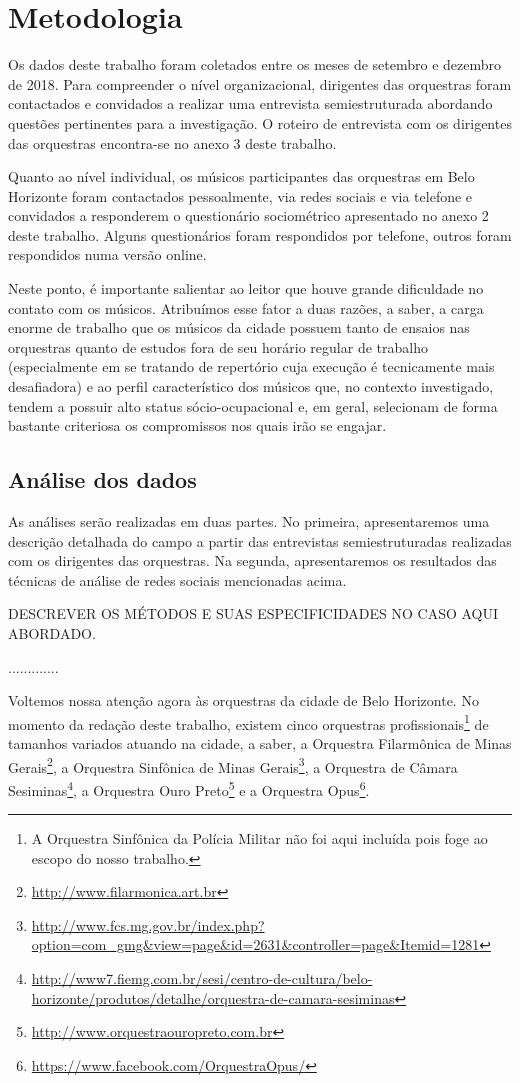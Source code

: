 \documentclass[a4paper, 12pt, openright, oneside, german, french, english, brazil]{abntex2}
\begin{document}
	\chapter{Metodologia}
	
	Os dados deste trabalho foram coletados entre os meses de setembro e dezembro de 2018. Para compreender o nível organizacional, dirigentes das orquestras foram contactados e convidados a realizar uma entrevista semiestruturada abordando questões pertinentes para a investigação. O roteiro de entrevista com os dirigentes das orquestras encontra-se no anexo 3 deste trabalho.
	
	Quanto ao nível individual, os músicos participantes das orquestras em Belo Horizonte foram contactados pessoalmente, via redes sociais e via telefone e convidados a responderem o questionário sociométrico apresentado no anexo 2 deste trabalho. Alguns questionários foram respondidos por telefone, outros foram respondidos numa versão online.
	
	Neste ponto, é importante salientar ao leitor que houve grande dificuldade no contato com os músicos. Atribuímos esse fator a duas razões, a saber, a carga enorme de trabalho que os músicos da cidade possuem tanto de ensaios nas orquestras quanto de estudos fora de seu horário regular de trabalho (especialmente em se tratando de repertório cuja execução é tecnicamente mais desafiadora) e ao perfil característico dos músicos que, no contexto investigado, tendem a possuir alto status sócio-ocupacional e, em geral, selecionam de forma bastante criteriosa os compromissos nos quais irão se engajar.
	
	\section{Análise dos dados}
	
	As análises serão realizadas em duas partes. No primeira, apresentaremos uma descrição detalhada do campo a partir das entrevistas semiestruturadas realizadas com os dirigentes das orquestras. Na segunda, apresentaremos os resultados das técnicas de análise de redes sociais mencionadas acima.
	
	DESCREVER OS MÉTODOS E SUAS ESPECIFICIDADES NO CASO AQUI ABORDADO.
	
	.............






	Voltemos nossa atenção agora às orquestras da cidade de Belo Horizonte. No momento da redação deste trabalho, existem cinco orquestras profissionais\footnote{A Orquestra Sinfônica da Polícia Militar não foi aqui incluída pois foge ao escopo do nosso trabalho.} de tamanhos variados atuando na cidade, a saber, a Orquestra Filarmônica de Minas Gerais\footnote{\url{http://www.filarmonica.art.br}}, a Orquestra Sinfônica de Minas Gerais\footnote{\url{http://www.fcs.mg.gov.br/index.php?option=com_gmg&view=page&id=2631&controller=page&Itemid=1281}}, a Orquestra de Câmara Sesiminas\footnote{\url{http://www7.fiemg.com.br/sesi/centro-de-cultura/belo-horizonte/produtos/detalhe/orquestra-de-camara-sesiminas}}, a Orquestra Ouro Preto\footnote{\url{http://www.orquestraouropreto.com.br}} e a Orquestra Opus\footnote{\url{https://www.facebook.com/OrquestraOpus/}}.
\end{document}
